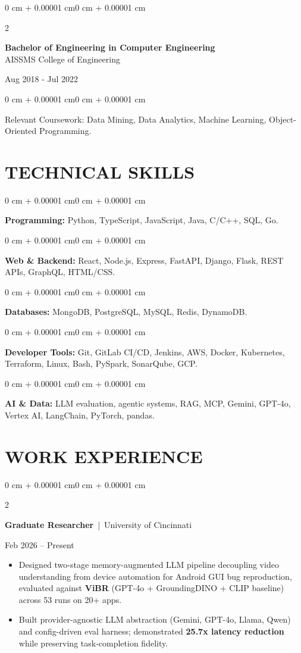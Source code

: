 \documentclass[10pt, letterpaper]{article}
\newenvironment{highlights}{
    \begin{itemize}[
        topsep=0.10 cm,
        parsep=0.06 cm,
        partopsep=0pt,
        itemsep=0.06 cm,
        leftmargin=12pt
    ]
}{
    \end{itemize}
}
\newenvironment{onecolentry}{
    \begin{adjustwidth}{0 cm + 0.00001 cm}{0 cm + 0.00001 cm}
}{
    \end{adjustwidth}
}
\newenvironment{twocolentry}[2][]{
    \onecolentry
    \def\secondColumn{#2}
    \setcolumnwidth{\fill, 4.5 cm}
    \begin{paracol}{2}
}{
    \switchcolumn \raggedleft \secondColumn
    \end{paracol}
    \endonecolentry
}
\begin{document}
\begin{twocolentry}{
    Aug 2018 - Jul 2022
}
    \textbf{Bachelor of Engineering in Computer Engineering} \\
    AISSMS College of Engineering
\end{twocolentry}
\begin{onecolentry}
Relevant Coursework: Data Mining, Data Analytics, Machine Learning, Object-Oriented Programming.
\end{onecolentry}
\section{TECHNICAL SKILLS}
\begin{onecolentry}
\textbf{Programming:} Python, TypeScript, JavaScript, Java, C/C++, SQL, Go.
\end{onecolentry}
\vspace{0.06 cm}
\begin{onecolentry}
\textbf{Web \& Backend:} React, Node.js, Express, FastAPI, Django, Flask, REST APIs, GraphQL, HTML/CSS.
\end{onecolentry}
\vspace{0.06 cm}
\begin{onecolentry}
\textbf{Databases:} MongoDB, PostgreSQL, MySQL, Redis, DynamoDB.
\end{onecolentry}
\vspace{0.06 cm}
\begin{onecolentry}
\textbf{Developer Tools:} Git, GitLab CI/CD, Jenkins, AWS, Docker, Kubernetes, Terraform, Linux, Bash, PySpark, SonarQube, GCP.
\end{onecolentry}
\vspace{0.06 cm}
\begin{onecolentry}
\textbf{AI \& Data:} LLM evaluation, agentic systems, RAG, MCP, Gemini, GPT-4o, Vertex AI, LangChain, PyTorch, pandas.
\end{onecolentry}

\section{WORK EXPERIENCE}
\begin{twocolentry}{Feb 2026 -- Present}
\textbf{Graduate Researcher} \,|\, University of Cincinnati
\end{twocolentry}
\begin{highlights}
  \item Designed two-stage memory-augmented LLM pipeline decoupling video understanding from device automation for Android GUI bug reproduction, evaluated against \textbf{ViBR} (GPT-4o + GroundingDINO + CLIP baseline) across 53 runs on 20+ apps.
  \item Built provider-agnostic LLM abstraction (Gemini, GPT-4o, Llama, Qwen) and config-driven eval harness; demonstrated \textbf{25.7x latency reduction} while preserving task-completion fidelity.
\end{highlights}
\end{document}
